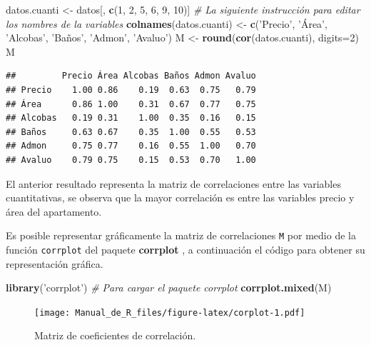 \documentclass[10pt,]{krantz}
\makeatletter
\newenvironment{Shaded}{\begin{snugshade}}{\end{snugshade}}
\newcommand{\KeywordTok}[1]{\textcolor[rgb]{0.13,0.29,0.53}{\textbf{{#1}}}}
\newcommand{\DataTypeTok}[1]{\textcolor[rgb]{0.13,0.29,0.53}{{#1}}}
\newcommand{\DecValTok}[1]{\textcolor[rgb]{0.00,0.00,0.81}{{#1}}}
\newcommand{\StringTok}[1]{\textcolor[rgb]{0.31,0.60,0.02}{{#1}}}
\newcommand{\CommentTok}[1]{\textcolor[rgb]{0.56,0.35,0.01}{\textit{{#1}}}}
\newcommand{\NormalTok}[1]{{#1}}
\newenvironment{kframe}{%
\medskip{}
\setlength{\fboxsep}{.8em}
 \def\at@end@of@kframe{}%
 \ifinner\ifhmode%
  \def\at@end@of@kframe{\end{minipage}}%
  \begin{minipage}{\columnwidth}%
 \fi\fi%
 \def\FrameCommand##1{\hskip\@totalleftmargin \hskip-\fboxsep
 \colorbox{shadecolor}{##1}\hskip-\fboxsep
     \hskip-\linewidth \hskip-\@totalleftmargin \hskip\columnwidth}%
 \MakeFramed {\advance\hsize-\width
   \@totalleftmargin\z@ \linewidth\hsize
   \@setminipage}}%
 {\par\unskip\endMakeFramed%
 \at@end@of@kframe}
\renewenvironment{Shaded}{\begin{kframe}}{\end{kframe}}
\makeatother
\begin{document}
\begin{Shaded}
\begin{Highlighting}[]
\NormalTok{datos.cuanti <-}\StringTok{ }\NormalTok{datos[, }\KeywordTok{c}\NormalTok{(}\DecValTok{1}\NormalTok{, }\DecValTok{2}\NormalTok{, }\DecValTok{5}\NormalTok{, }\DecValTok{6}\NormalTok{, }\DecValTok{9}\NormalTok{, }\DecValTok{10}\NormalTok{)]}
\CommentTok{# La siguiente instrucción para editar los nombres de la variables}
\KeywordTok{colnames}\NormalTok{(datos.cuanti) <-}\StringTok{ }\KeywordTok{c}\NormalTok{(}\StringTok{'Precio'}\NormalTok{, }\StringTok{'Área'}\NormalTok{, }\StringTok{'Alcobas'}\NormalTok{,}
                            \StringTok{'Baños'}\NormalTok{, }\StringTok{'Admon'}\NormalTok{, }\StringTok{'Avaluo'}\NormalTok{)}
\NormalTok{M <-}\StringTok{ }\KeywordTok{round}\NormalTok{(}\KeywordTok{cor}\NormalTok{(datos.cuanti), }\DataTypeTok{digits=}\DecValTok{2}\NormalTok{)}
\NormalTok{M}
\end{Highlighting}
\end{Shaded}

\begin{verbatim}
##         Precio Área Alcobas Baños Admon Avaluo
## Precio    1.00 0.86    0.19  0.63  0.75   0.79
## Área      0.86 1.00    0.31  0.67  0.77   0.75
## Alcobas   0.19 0.31    1.00  0.35  0.16   0.15
## Baños     0.63 0.67    0.35  1.00  0.55   0.53
## Admon     0.75 0.77    0.16  0.55  1.00   0.70
## Avaluo    0.79 0.75    0.15  0.53  0.70   1.00
\end{verbatim}

El anterior resultado representa la matriz de correlaciones entre las
variables cuantitativas, se observa que la mayor correlación es entre
las variables precio y área del apartamento.

Es posible representar gráficamente la matriz de correlaciones
\texttt{M} por medio de la función \texttt{corrplot} del paquete
\textbf{corrplot} \citep{R-corrplot}, a continuación el
código para obtener su representación gráfica.

\begin{Shaded}
\begin{Highlighting}[]
\KeywordTok{library}\NormalTok{(}\StringTok{'corrplot'}\NormalTok{)  }\CommentTok{# Para cargar el paquete corrplot}
\KeywordTok{corrplot.mixed}\NormalTok{(M)}
\end{Highlighting}
\end{Shaded}

\begin{figure}[htbp]
\centering
\texttt{[image: Manual\_de\_R\_files/figure-latex/corplot-1.pdf]}
\caption{\label{fig:corplot}Matriz de coeficientes de correlación.}
\end{figure}
\end{document}
